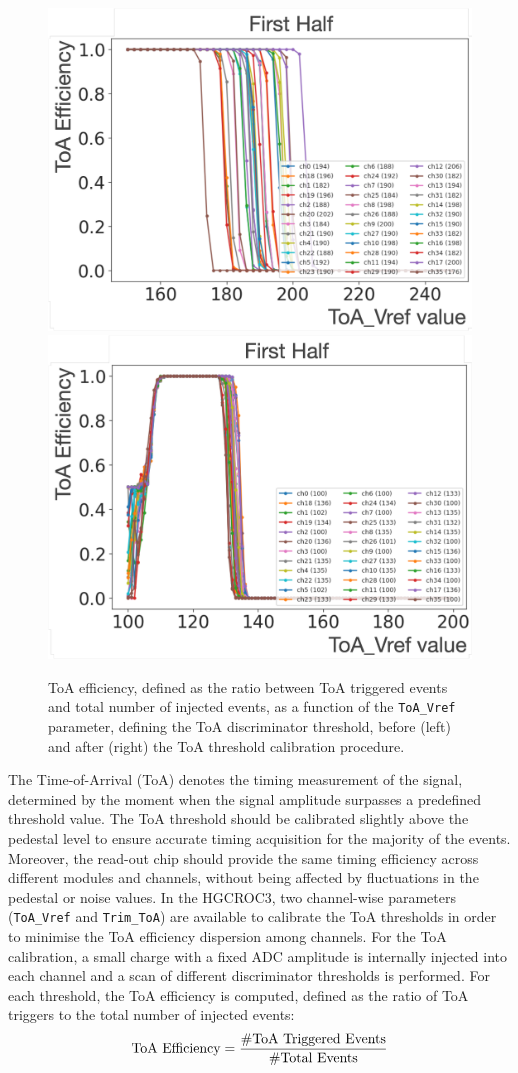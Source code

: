 \begin{figure}
    \centering
    \includegraphics[width=0.49\linewidth]{Figures/HGCAL/ToA_Eff_0.pdf}
    \includegraphics[width=0.49\linewidth]{Figures/HGCAL/ToA_Eff_1.pdf}
    \caption{ToA efficiency, defined as the ratio between ToA triggered events and total number of injected events, as a function of the \texttt{ToA\_Vref} parameter, defining the ToA discriminator threshold, before (left) and after (right) the ToA threshold calibration procedure.}
    \label{fig:ToAEff}
\end{figure}

The Time-of-Arrival (ToA) denotes the timing measurement of the signal, determined by the moment when the signal amplitude surpasses a predefined threshold value. The ToA threshold should be calibrated slightly above the pedestal level to ensure accurate timing acquisition for the majority of the events. Moreover, the read-out chip should provide the same timing efficiency across different modules and channels, without being affected by fluctuations in the pedestal or noise values.
In the HGCROC3, two channel-wise parameters (\texttt{ToA\_Vref} and \texttt{Trim\_ToA}) are available to calibrate the ToA thresholds in order to minimise the ToA efficiency dispersion among channels.
For the ToA calibration, a small charge with a fixed ADC amplitude is internally injected into each channel and a scan of different discriminator thresholds is performed. For each threshold, the ToA efficiency is computed, defined as the ratio of ToA triggers to the total number of injected events:
\begin{equation}
    \textnormal{ToA Efficiency} = \frac{\# \textnormal{ToA Triggered Events}}{\# \textnormal{Total Events}}
\end{equation}

